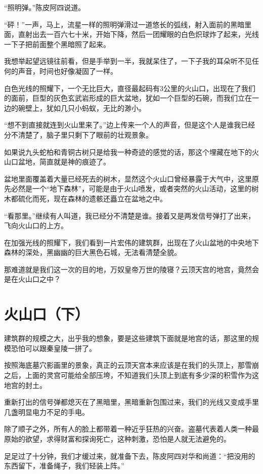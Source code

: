“照明弹。”陈皮阿四说道。

“砰！”一声，马上，流星一样的照明弹滑过一道悠长的弧线，射入面前的黑暗里面，直射出去一百六七十米，开始下降，然后一团耀眼的白色炽球炸了起来，光线一下子把前面整个黑暗照了起来。

我想举起望远镜往前看，但是手举到一半，我就呆住了，一下子我的耳朵听不见任何的声音，时间也好像凝固了一样。

白色光线的照耀下，一个无比巨大，直径最起码有3公里的火山口，出现在了我们的面前，巨型的灰色玄武岩形成的巨大盆地，犹如一个巨型的石碗，而我们立在一边的碗壁上，犹如几只小蚂蚁，无比的渺小。

“想不到直接就连到火山里来了。”边上传来一个人的声音，但是这个人是谁我已经分不清楚了，脑子里只剩下了眼前的壮观景象。

如果说九头蛇柏和青铜古树只是给我一种奇迹的感觉的话，那这个埋藏在地下的火山口盆地，简直就是神的痕迹了。

盆地里面覆盖着大量已经死去的树木，显然这个火山口曾经暴露于大气中，这里原先必然是一个“地下森林”，可能是由于火山喷发，或者突然的火山活动，这里的树木都硫化而死，现在森林的遗骸还矗立在盆地之中。

“看那里。”继续有人叫道，我已经分不清楚是谁。接着又是两发信号弹打了出来，飞向火山口的上方。

在加强光线的照耀下，我们看到一片宏伟的建筑群，出现在了火山盆地的中央地下森林的深处，黑幽幽的巨大黑色石城，无法看清楚全貌。

那难道就是我们这一次的目的地，万奴皇帝万世的陵寝？云顶天宫的地宫，竟然会是在火山口之中？

\chapter{火山口（下）}

建筑群的规模之大，出乎我的想象，要是这些建筑下面就是地宫的话，那这里的规模恐怕可以跟秦皇陵一拼了。

按照海底墓穴影画里的景象，真正的云顶天宫本来应该是在我们的头顶上，那雪崩之后，上面的灵宫可能给全部压垮，不知道我们头顶上到底有多少深的积雪作为这地宫的封土。

重新打出的信号弹都熄灭在了黑暗里，黑暗重新包围过来，我们的光线又变成手里几盏明显电力不足的手电。

除了顺子之外，所有人的脸上都带着一种近乎狂热的兴奋。盗墓代表着人类一种最原始的欲望，求得财富和探询死亡，这种刺激，恐怕是人就无法避免的。

足足过了十分钟，我们才缓过来，就准备下去，陈皮阿四对华和尚道：“把没用的东西留下，准备绳子，我们轻装上阵。”

